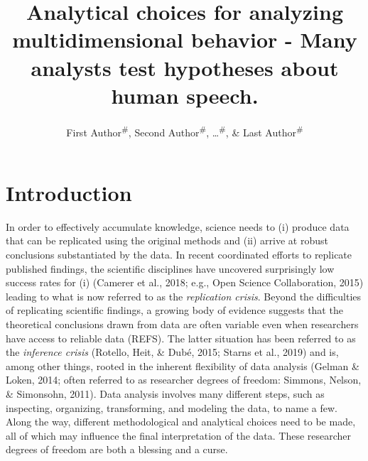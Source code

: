 \documentclass[
  english,
  man,floatsintext]{apa6}
\title{Analytical choices for analyzing multidimensional behavior - Many analysts test hypotheses about human speech.}
\author{First Author\textsuperscript{\#}, Second Author\textsuperscript{\#}, \ldots{}\textsuperscript{\#}, \& Last Author\textsuperscript{\#}}
\date{}
\affiliation{\vspace{0.5cm}\textsuperscript{1} \#\\\textsuperscript{\ldots{}} \ldots{}}
\begin{document}
\maketitle

\hypertarget{introduction}{%
\section{Introduction}\label{introduction}}

In order to effectively accumulate knowledge, science needs to (i) produce data that can be replicated using the original methods and (ii) arrive at robust conclusions substantiated by the data.
In recent coordinated efforts to replicate published findings, the scientific disciplines have uncovered surprisingly low success rates for (i) (Camerer et al., 2018; e.g., Open Science Collaboration, 2015) leading to what is now referred to as the \emph{replication crisis}.
Beyond the difficulties of replicating scientific findings, a growing body of evidence suggests that the theoretical conclusions drawn from data are often variable even when researchers have access to reliable data (REFS).
The latter situation has been referred to as the \emph{inference crisis} (Rotello, Heit, \& Dubé, 2015; Starns et al., 2019) and is, among other things, rooted in the inherent flexibility of data analysis (Gelman \& Loken, 2014; often referred to as researcher degrees of freedom: Simmons, Nelson, \& Simonsohn, 2011).
Data analysis involves many different steps, such as inspecting, organizing, transforming, and modeling the data, to name a few.
Along the way, different methodological and analytical choices need to be made, all of which may influence the final interpretation of the data.
These researcher degrees of freedom are both a blessing and a curse.
\end{document}
